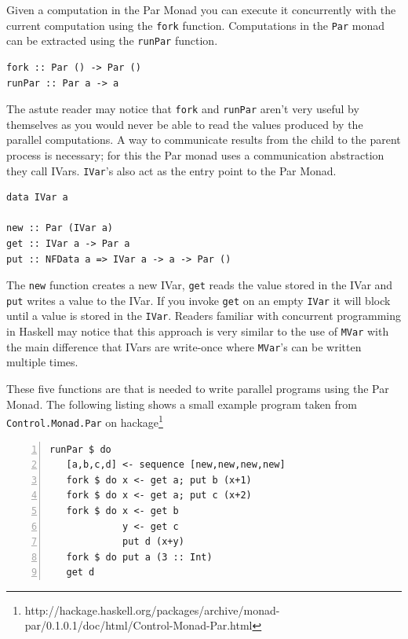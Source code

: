 \documentclass[a4paper, oneside, final]{memoir}
\begin{document}
Given a computation in the Par Monad you can execute it concurrently with the current computation using the \texttt{fork} function. Computations in the \texttt{Par} monad can be extracted using the \texttt{runPar} function. \newline

\begin{lstlisting}
fork :: Par () -> Par ()
runPar :: Par a -> a
\end{lstlisting}

The astute reader may notice that \texttt{fork} and \texttt{runPar} aren't very useful by themselves as you would never be able to read the values produced by the parallel computations. A way to communicate results from the child to the parent process is necessary; for this the Par monad uses a communication abstraction they call IVars. \texttt{IVar}'s also act as the entry point to the Par Monad. \newline

\begin{lstlisting}
data IVar a 

new :: Par (IVar a)
get :: IVar a -> Par a
put :: NFData a => IVar a -> a -> Par ()
\end{lstlisting}

The \texttt{new} function creates a new IVar, \texttt{get} reads the
value stored in the IVar and \texttt{put} writes a value to the IVar.
If you invoke \texttt{get} on an empty \texttt{IVar} it will block
until a value is stored in the \texttt{IVar}. Readers familiar with
concurrent programming in Haskell may notice that this approach is
very similar to the use of \texttt{MVar} with the main difference that
IVars are write-once where \texttt{MVar}'s can be written multiple
times.

These five functions are that is needed to write parallel programs
using the Par Monad. The following listing shows a small example
program taken from \texttt{Control.Monad.Par} on
hackage\footnote{http://hackage.haskell.org/packages/archive/monad-
par/0.1.0.1/doc/html/Control-Monad-Par.html} \newline

\begin{lstlisting}[numbers=left, numberstyle=\tiny]
runPar $ do
   [a,b,c,d] <- sequence [new,new,new,new]
   fork $ do x <- get a; put b (x+1)
   fork $ do x <- get a; put c (x+2)
   fork $ do x <- get b
             y <- get c 
             put d (x+y)
   fork $ do put a (3 :: Int)
   get d
\end{lstlisting}
\end{document}
